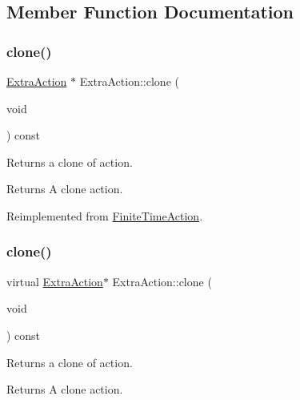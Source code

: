 \subsection{Member Function Documentation}
\mbox{\label{classExtraAction_a758a349952071ad00b74ddf34cfa9b2a}} 
\subsubsection{\texorpdfstring{clone()}{clone()}\hspace{0.1cm}{\footnotesize\ttfamily [1/2]}}
{\footnotesize\ttfamily \hyperlink{classExtraAction}{Extra\+Action} $\ast$ Extra\+Action\+::clone (\begin{DoxyParamCaption}\item[{void}]{ }\end{DoxyParamCaption}) const\hspace{0.3cm}{\ttfamily [virtual]}}

Returns a clone of action.

\begin{DoxyReturn}{Returns}
A clone action. 
\end{DoxyReturn}


Reimplemented from \hyperlink{classFiniteTimeAction_a44813fca4fdf22f367a4657147dd150b}{Finite\+Time\+Action}.

\mbox{\label{classExtraAction_ab934c199930dec4d3bff42d61ce940da}} 
\subsubsection{\texorpdfstring{clone()}{clone()}\hspace{0.1cm}{\footnotesize\ttfamily [2/2]}}
{\footnotesize\ttfamily virtual \hyperlink{classExtraAction}{Extra\+Action}$\ast$ Extra\+Action\+::clone (\begin{DoxyParamCaption}\item[{void}]{ }\end{DoxyParamCaption}) const\hspace{0.3cm}{\ttfamily [virtual]}}

Returns a clone of action.

\begin{DoxyReturn}{Returns}
A clone action. 
\end{DoxyReturn}


